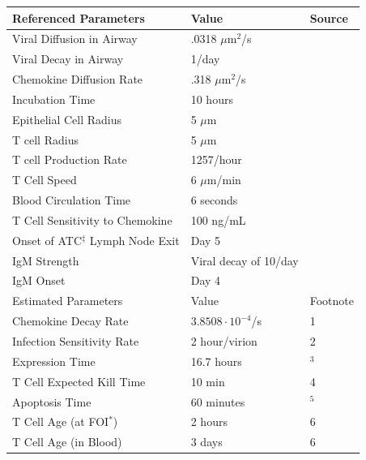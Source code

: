 \documentclass[10pt]{article}
\begin{document}
\begin{table}
\begin{center}
\begin{tabular}{| l l l |}
  \hline                        
  Referenced Parameters & Value & Source \\
  \hline
  Viral Diffusion in Airway & .0318 $\mu$m$^2$/s & \cite{Beauchemin2006} \\
  Viral Decay in Airway &  1/day & \cite{Lee2009} \\
  Chemokine Diffusion Rate & .318 $\mu$m$^2$/s & \cite{Beauchemin2006} \\
  Incubation Time &  10 hours & \cite{Mitchell2011} \\
  Epithelial Cell Radius & 5 $\mu$m & \cite{Elbert1999} \\
  T cell Radius & 5 $\mu$m & \cite{abbas2011cellular} \\
  T cell Production Rate & 1257/hour & \cite{Miao2010} \\ 
  T Cell Speed & 6 $\mu$m/min & \cite{Egen2011} \\
  Blood Circulation Time & 6 seconds & \cite{Banerjee2010b} \\
  T Cell Sensitivity to Chemokine & 100 ng/mL & \cite{Nandagopal2011} \\
  Onset of ATC$^\ddagger$ Lymph Node Exit & Day 5 & \cite{Banerjee2011} \\
  IgM Strength & Viral decay of 10/day & \cite{Diamond2003} \\
  IgM Onset & Day 4 & \cite{Diamond2003} \\
  \hline
  \hline                        
  Estimated Parameters & Value & Footnote \\
  \hline
  Chemokine Decay Rate & $3.8508\cdot10^{-4}$/s & 1\\
  Infection Sensitivity Rate & 2 hour/virion &  2 \\
  Expression Time & 16.7 hours & \cite{Mitchell2011}$^3$ \\
  T Cell Expected Kill Time & 10 min & 4 \\
  Apoptosis Time & 60 minutes & \cite{Ganusov2008}$^5$ \\
  T Cell Age (at FOI$^\ast$) & 2 hours & 6 \\
  T Cell Age (in Blood) & 3 days & 6 \\
  \hline  
\end{tabular}

\end{center}
\end{table}
\end{document}
